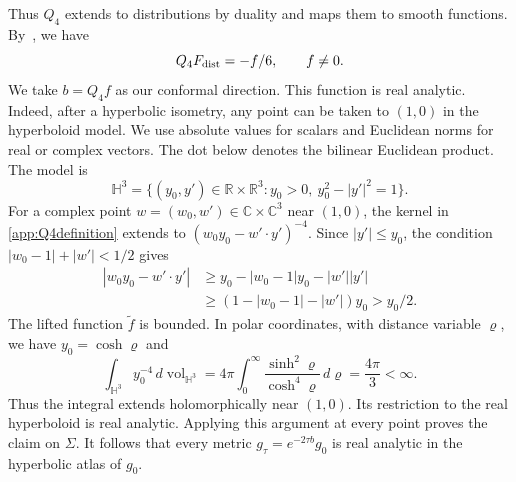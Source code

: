\documentclass[11pt,letterpaper,reqno]{amsart}
\theoremstyle{remark}
\begin{document}
Thus $Q_4$ extends to distributions by duality and maps them to smooth functions.
By~\cite[Theorem~5 and Proposition~A.1]{CDDP}, we have
\[
 Q_4F_{\rm dist}=-f/6,\qquad f\ne0.
\]
We take $b=Q_4f$ as our conformal direction.
This function is real analytic. Indeed, after a hyperbolic isometry,
any point can be taken to $(1,0)$ in the hyperboloid model.
We use absolute values for scalars and Euclidean norms for real or
complex vectors. The dot below denotes the bilinear Euclidean product.
The model is
\[
 \mathbb H^3=\{(y_0,y')\in\mathbb R\times\mathbb R^3:
                  y_0>0,\ y_0^2-|y'|^2=1\}.
\]
For a complex point $w=(w_0,w')\in\mathbb C\times\mathbb C^3$
near $(1,0)$, the kernel in
\eqref{app:Q4definition} extends to $(w_0y_0-w'\cdot y')^{-4}$.
Since $|y'|\leq y_0$, the condition
$|w_0-1|+|w'|<1/2$ gives
\[
 \begin{aligned}
 |w_0y_0-w'\cdot y'|
 &\geq y_0-|w_0-1|y_0-|w'||y'|\\
 &\geq(1-|w_0-1|-|w'|)y_0>y_0/2.
 \end{aligned}
\]
The lifted function $\widetilde f$ is bounded. In polar coordinates,
with distance variable $\varrho$, we have $y_0=\cosh\varrho$ and
\[
 \int_{\mathbb H^3}y_0^{-4}\,d\operatorname{vol}_{\mathbb H^3}
 =4\pi\int_0^\infty\frac{\sinh^2\varrho}{\cosh^4\varrho}\,d\varrho
 =\frac{4\pi}{3}<\infty.
\]
Thus the integral extends holomorphically near $(1,0)$.
Its restriction to the real hyperboloid is real analytic.
Applying this argument at every point proves the claim on $\Sigma$.
It follows that every metric $g_\tau=e^{-2\tau b}g_0$ is real analytic
in the hyperbolic atlas of $g_0$.
\end{document}
